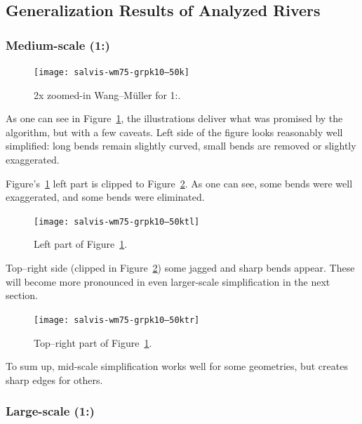 \documentclass[a4paper]{article}
\newcommand{\WM}{Wang--M{\"u}ller}
\begin{document}
\subsection{Generalization Results of Analyzed Rivers}
\label{sec:generalization-results-of-analyzed-rivers}

\subsubsection{Medium-scale (1:)}
\label{sec:analyzed-medium-scale}

\begin{figure}[h!]
    \centering
    \texttt{[image: salvis-wm75-grpk10--50k]}
    \caption{2x zoomed-in {\WM} for 1:.}
    \label{fig:salvis-wm75-grpk10--50k}
\end{figure}

As one can see in Figure~\ref{fig:salvis-wm75-grpk10--50k}, the illustrations deliver
what was promised by the algorithm, but with a few caveats. Left side of the
figure looks reasonably well simplified: long bends remain slightly curved,
small bends are removed or slightly exaggerated.

Figure's~\ref{fig:salvis-wm75-grpk10--50k} left part is clipped to
Figure~\ref{fig:salvis-wm75-grpk10--50ktl}. As one can see, some bends were well
exaggerated, and some bends were eliminated.

\begin{figure}[h!]
    \centering
    \texttt{[image: salvis-wm75-grpk10--50ktl]}
    \caption{Left part of Figure~\ref{fig:salvis-wm75-grpk10--50k}.}
    \label{fig:salvis-wm75-grpk10--50ktl}
\end{figure}

Top--right side (clipped in Figure~\ref{fig:salvis-wm75-grpk10--50ktl}) some jagged
and sharp bends appear. These will become more pronounced in even larger-scale
simplification in the next section.

\begin{figure}[h!]
    \centering
    \texttt{[image: salvis-wm75-grpk10--50ktr]}
    \caption{Top--right part of Figure~\ref{fig:salvis-wm75-grpk10--50k}.}
    \label{fig:salvis-wm75-grpk10--50ktr}
\end{figure}

To sum up, mid-scale simplification works well for some geometries, but creates
sharp edges for others.

\subsubsection{Large-scale (1:)}
\label{sec:analyzed-large-scale}
\end{document}
